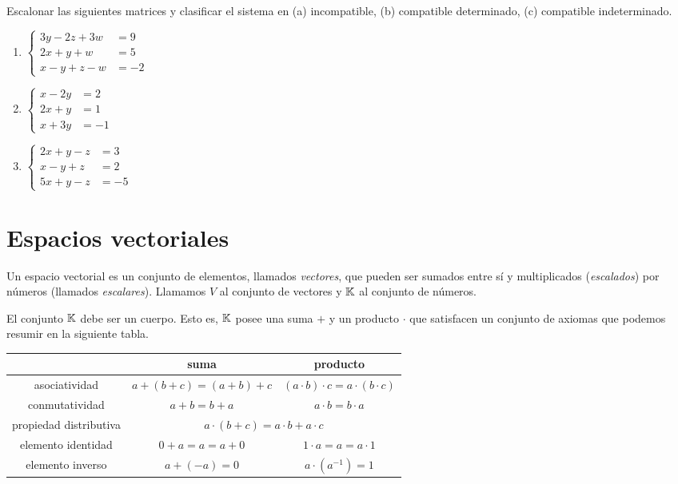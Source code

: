 \begin{ejercicio} Escalonar las siguientes matrices y clasificar el sistema
en (a) incompatible, (b) compatible determinado, (c) compatible
indeterminado.

\begin{multicols}{3}
\begin{enumerate}
\item $\left\{
\begin{aligned}
3y - 2z + 3 w &= 9\\
2x + y + w &= 5\\
x-y+z-w &= -2
\end{aligned}
\right.$
\item $\left\{
\begin{aligned}
x - 2y &= 2\\
2x +  y & =1\\
x + 3y & = -1
\end{aligned}\right.$
\item $\left\{
\begin{aligned}
2x + y -z &= 3\\
x - y +z & = 2\\
5x + y -z &= -5
\end{aligned}\right.$
\end{enumerate}
\end{multicols}
\end{ejercicio}


\section{Espacios vectoriales}
Un espacio vectorial es un conjunto de elementos, llamados \emph{vectores}, que pueden ser sumados entre sí y multiplicados (\emph{escalados}) por números (llamados \emph{escalares}). Llamamos $V$ al conjunto de vectores y $\mathbb K$ al conjunto de n\'umeros.

El conjunto $\mathbb K$ debe ser un cuerpo. Esto es, $\mathbb K$ posee una suma $+$ y un producto $\cdot$ que satisfacen un conjunto de axiomas que podemos resumir en la siguiente tabla.

\begin{center}
\begin{tabular}{ |c|c|c| } \hline
& suma & producto \\ \hline
 asociatividad & $a + (b + c) = (a+b) + c$ & $(a\cdot b) \cdot c = a\cdot (b\cdot c)$ \\ \hline
 conmutatividad & $a + b = b + a$ & $a \cdot b = b \cdot a$ \\ \hline
 propiedad distributiva & \multicolumn{2}{|c|}{$a \cdot (b + c) = a \cdot b + a \cdot c$} \\ \hline
 elemento identidad & $0 + a = a = a + 0$ & $1 \cdot a = a = a \cdot 1$ \\ \hline
 elemento inverso & $a + (-a) = 0$ & $a \cdot (a^{-1}) = 1$ \\ \hline
\end{tabular}
\end{center}


